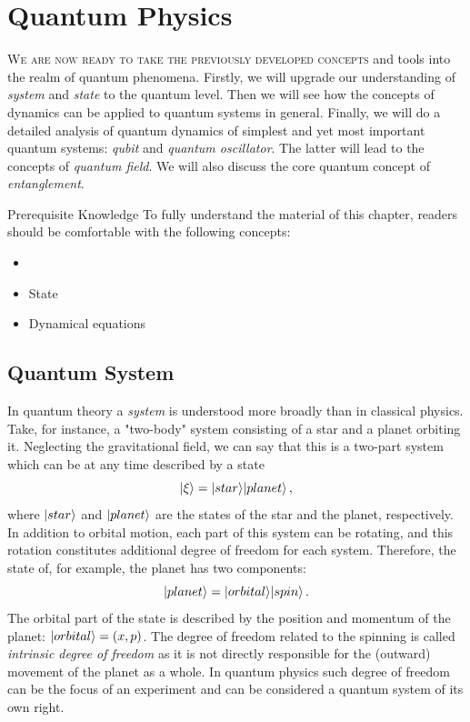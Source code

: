 \graphicspath{{../05QuantumPhysics/pics/}}

\chapter{Quantum Physics}\label{ch:QuantumPhysics}
\lettrine[lines=2]{\color{darkocre}W}{e are now ready to take the previously developed concepts}  and tools into the realm of quantum phenomena. Firstly, we will upgrade our understanding of \emph{system} and \emph{state} to the quantum level. Then we will see how the concepts of dynamics can be applied to quantum systems in general. Finally, we will do a detailed analysis of quantum dynamics of simplest and yet most important quantum systems: \emph{qubit} and \emph{quantum oscillator}. The latter will lead to the concepts of \emph{quantum field}. We will also discuss the core quantum concept of \emph{entanglement}.


\begin{myprereq}{Prerequisite Knowledge}
To fully understand the material of this chapter, readers should be comfortable with the following concepts:

\begin{itemize}
	\item \phantom{phantom}
	\vspace{-0.5cm}
	\item State
	\item Dynamical equations
\end{itemize}	
\end{myprereq}

\section{Quantum System}\label{sec:QuantumSystem}
In quantum theory a \emph{system} is understood more broadly than in classical physics. Take, for instance, a "two-body" system consisting of a star and a planet orbiting it. Neglecting the gravitational field, we can say that this is a two-part system which can be at any time described by a state
\[
|{\xi}\rangle = |{star}\rangle|{planet}\rangle\,,
\] 
where $|{star}\rangle$ and $|{planet}\rangle$ are the states of the star and the planet, respectively. In addition to orbital motion, each part of this system can be rotating, and this rotation constitutes additional degree of freedom for each system. Therefore, the state of, for example, the planet has two components:
\[
|{planet}\rangle=|{orbital}\rangle|{spin}\rangle\,.
\]
The orbital part of the state is described by the position and momentum of the planet: $|{orbital}\rangle=(x, p)$. The degree of freedom related to the spinning is called \emph{intrinsic degree of freedom} as it is not directly responsible for the (outward) movement of the planet as a whole. In quantum physics such degree of freedom can be the focus of an experiment and can be considered a quantum system of its own right.


